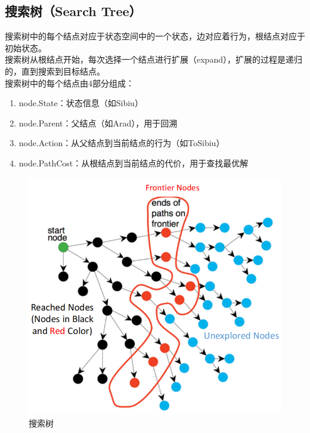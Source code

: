 \vspace{0.5cm}

\subsection{搜索树（Search Tree）}

搜索树中的每个结点对应于状态空间中的一个状态，边对应着行为，根结点对应于初始状态。\\

搜索树从根结点开始，每次选择一个结点进行扩展（expand），扩展的过程是递归的，直到搜索到目标结点。\\

搜索树中的每个结点由4部分组成：

\begin{enumerate}
    \item node.State：状态信息（如Sibiu）
    \item node.Parent：父结点（如Arad），用于回溯
    \item node.Action：从父结点到当前结点的行为（如ToSibiu）
    \item node.PathCost：从根结点到当前结点的代价，用于查找最优解
\end{enumerate}

\begin{figure}[H]
    \centering
    \includegraphics[scale=0.8]{img/C1/1-3/3.png}
    \caption{搜索树}
\end{figure}

